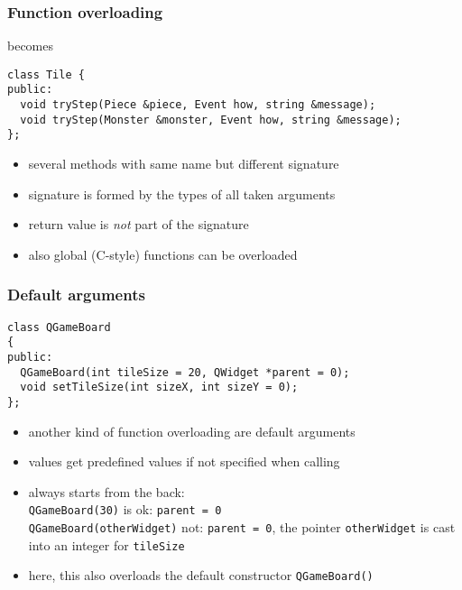 \documentclass{slides}
\begin{document}
\begin{frame}[fragile]
  \frametitle{Function overloading}
  
  \begin{center}
  \end{center}
  becomes
\begin{lstlisting}
class Tile {
public:
  void tryStep(Piece &piece, Event how, string &message);
  void tryStep(Monster &monster, Event how, string &message);
};
\end{lstlisting}

  \begin{itemize}
  \item several methods with same name but different signature
  \item signature is formed by the types of all taken arguments
  \item return value is \emph{not} part of the signature
  \item also global (C-style) functions can be overloaded
  \end{itemize}
\end{frame}

\begin{frame}[fragile]
  \frametitle{Default arguments}
  
\begin{lstlisting}
class QGameBoard
{
public:
  QGameBoard(int tileSize = 20, QWidget *parent = 0);
  void setTileSize(int sizeX, int sizeY = 0);
};
\end{lstlisting}

  \begin{itemize}
  \item another kind of function overloading are default arguments
  \item values get predefined values if not specified when calling
  \item always starts from the back:\\
    \lstinline!QGameBoard(30)! is ok: \lstinline!parent = 0!\\
    \lstinline!QGameBoard(otherWidget)! not:
    \lstinline!parent = 0!, the pointer \lstinline!otherWidget! is cast into an
    integer for \lstinline!tileSize!
  \item here, this also overloads the default constructor
    \lstinline!QGameBoard()!
  \end{itemize}
\end{frame}
\end{document}
